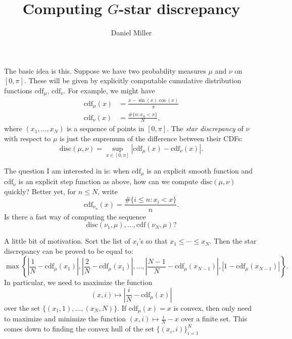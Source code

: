 \documentclass{article}
\title{Computing $G$-star discrepancy}
\author{Daniel Miller}
\newcommand{\cdf}{\mathrm{cdf}}
\newcommand{\disc}{\mathrm{disc}}
\begin{document}
\maketitle





The basic idea is this. Suppose we have two probability measures 
$\mu$ and $\nu$ on $[0,\pi]$. These will be given by explicitly computable 
cumulative distribution functions $\cdf_\mu$, $\cdf_\nu$. For example, we might 
have 
\begin{align*}
	\cdf_\mu(x) &= \frac{x-\sin(x)\cos(x)}{\pi} \\
	\cdf_\nu(x) &= \frac{\#\{n : x_n <x\}}{N} ,
\end{align*}
where $(x_1,\dots,x_N)$ is a sequence of points in $[0,\pi]$. The 
\emph{star discrepancy} of $\nu$ with respect to $\mu$ is just the supremum of 
the difference between their CDFs:
\[
	\disc(\mu,\nu) = \sup_{x\in [0,\pi]} |\cdf_\mu(x)-\cdf_\nu(x)| .
\]

The question I am interested in is: when $\cdf_\mu$ is an explicit smooth 
function and $\cdf_\nu$ is an explicit step function as above, how can we 
compute $\disc(\mu,\nu)$ quickly? Better yet, for $n\leqslant N$, write 
\[
	\cdf_{\nu_n}(x) = \frac{\# \{i\leqslant n : x_i<x\}}{n}  .
\]
Is there a fast way of computing the sequence 
\[
	\disc(\nu_1,\mu),\dots,\cdf(\nu_N,\mu) ?
\]

A little bit of motivation. Sort the list of $x_i$'s so that 
$x_1 \leqslant \cdots \leqslant x_N$. Then the star discrepancy 
can be proved to be equal to:
\[
	\max\left\{ \left|\frac{1}{N} - \cdf_\mu(x_{1})\right|,\left|\frac{2}{N}-\cdf_\mu(x_1)\right|,\dots,\left| \frac{N-1}{N}-\cdf_\mu(x_{N-1})\right|,\left| 1-\cdf_\mu(x_{N-1})\right|\right\} .
\]
In particular, we need to maximize the function
\[
	(x,i) \mapsto \left| \frac{i}{N} - \cdf_\mu(x)\right|
\]
over the set $\{(x_1,1),\dots,(x_N,N)\}$. If $\cdf_\mu(x)=x$ is convex, then 
only need to maximize and minimize the function $(x,i)\mapsto \frac{i}{N}-x$ 
over a finite set. This comes down to finding the convex hull of the set 
$\{(x_i,i)\}_{i=1}^N$
\end{document}
